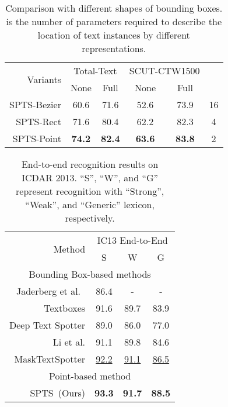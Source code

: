 \documentclass[sigconf]{acmart}
\newcommand{\methodName}{SPTS}
\begin{document}
\begin{table}[t!]
\centering
\caption{Comparison with different shapes of bounding boxes.  is the number of parameters required to describe the location of text instances by different representations.}
\label{tab:ab_box_shape}
\footnotesize
\begin{tabular}{r|cc|cc|c}
\hline
\multirow{2}{*}{Variants} & \multicolumn{2}{c|}{Total-Text}                   & \multicolumn{2}{c|}{SCUT-CTW1500} &
\multirow{2}{*}{} \\ \cline{2-5} 
                        & \multicolumn{1}{c|}{None}    & \multicolumn{1}{c|}{Full} 
                        & \multicolumn{1}{c|}{None}    & \multicolumn{1}{c|}{Full}
                        & \\ \hline
SPTS-Bezier& 60.6 & 71.6 & 52.6 & 73.9 & 16 \\ 
SPTS-Rect & 71.6 & 80.4 & 62.2 & 82.3 & 4 \\  SPTS-Point &\textbf{74.2} & \textbf{82.4} & \textbf{63.6} & \textbf{83.8} & 2  \\ \hline
\end{tabular}
\end{table}

\begin{table}[t!]
    \centering
    \caption{End-to-end recognition results on ICDAR 2013. ``S'', ``W'', and ``G'' represent recognition with “Strong”, “Weak”, and “Generic” lexicon, respectively.}
    \label{ICDAR 2013 End-to-End recognition result}
    \footnotesize
    \begin{tabular}{r|c|c|c}
    \hline
    \multirow{2}{*}{Method} & \multicolumn{3}{c}{IC13 End-to-End} \\ \cline{2-4} 
                            & \multicolumn{1}{c|}{S}    & \multicolumn{1}{c|}{W}    & G    \\ \hline
    \multicolumn{4}{c}{Bounding Box-based methods} \\ \hline                        
    Jaderberg et al.\  \cite{jaderberg2016reading} & 86.4 & - & -\\ 
    Textboxes \cite{liao2017textboxes} & 91.6 & 89.7 & 83.9\\ 
    Deep Text Spotter \cite{busta2017deep} & 89.0 & 86.0 & 77.0\\ 
    Li et al. \cite{li2017towards} & 91.1 & 89.8 & 84.6 \\ 
    MaskTextSpotter \cite{lyu2018mask} & \underline{92.2} & \underline{91.1} & \underline{86.5} \\ 
    \hline 
\multicolumn{4}{c}{Point-based method} \\ \hline
    \methodName\ (Ours) & \textbf{93.3} & \textbf{91.7} & \textbf{88.5} \\ \hline
    \end{tabular}
\end{table}
    
\end{document}
